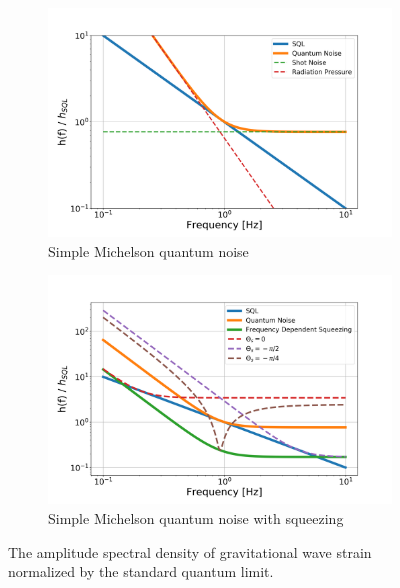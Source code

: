 	\begin{figure}[ht]
		\centering
		\begin{subfigure}[b]{0.45\textwidth}
			\centering
			\includegraphics[width=\textwidth]{../Figures/Kimble_SM_QM.png}
			\caption{Simple Michelson quantum noise}
			\label{fig:kimble_SM}
		\end{subfigure}
		\hfill
		\begin{subfigure}[b]{0.45\textwidth}
			\centering
			\includegraphics[width=\textwidth]{../Figures/Kimble_SM_QM_sqz.png}
			\caption{Simple Michelson quantum noise with squeezing}
			\label{fig:kimble_SM_sqz}
		\end{subfigure}
		\caption{The amplitude spectral density of gravitational wave strain normalized by the standard quantum limit.}
		\label{fig:PSD_SM}
	\end{figure}
	
